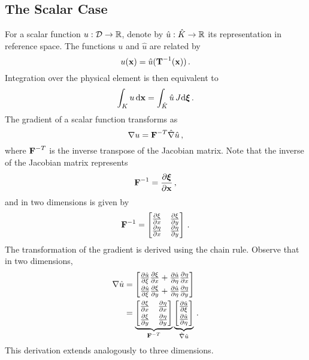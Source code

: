 \documentclass[../doc.tex]{subfiles}
\begin{document}
\subsection{The Scalar Case}
For a scalar function $u : \mathcal{D} \rightarrow \mathbb{R}$, denote by $\hat{u} : \hat{K} \rightarrow \mathbb{R}$ its representation in reference space. The functions $u$ and $\hat{u}$ are related by 
	\begin{equation} \label{fem:scalar_trans}
		u(\boldsymbol{\mathrm{x}}) = \hat{u}(\boldsymbol{\mathrm{T}}^{-1}(\boldsymbol{\mathrm{x}})) \,.  	
	\end{equation}
Integration over the physical element is then equivalent to 
	\begin{equation}
		\int_K u \mathop{}\!\mathrm{d} \boldsymbol{\mathrm{x}} = \int_{\hat{K}} \hat{u}\, J\!\mathop{}\!\mathrm{d}\boldsymbol{\xi} \,. 
	\end{equation}
The gradient of a scalar function transforms as
	\begin{equation} \label{fem:scalar_trans_grad}
		\nabla u = \boldsymbol{\mathrm{F}}^{-T} \hat{\nabla} \hat{u} \,, 
	\end{equation}
where $\boldsymbol{\mathrm{F}}^{-T}$ is the inverse transpose of the Jacobian matrix. Note that the inverse of the Jacobian matrix represents
	\begin{equation}
		\boldsymbol{\mathrm{F}}^{-1} = \frac{\partial \boldsymbol{\xi}}{\partial \boldsymbol{\mathrm{x}}} \,, 
	\end{equation}
and in two dimensions is given by 
	\begin{equation}
		\boldsymbol{\mathrm{F}}^{-1} = \begin{bmatrix} 
			\frac{\partial \xi}{\partial x} & \frac{\partial \xi}{\partial y} \\ 
			\frac{\partial \eta}{\partial x} & \frac{\partial \eta}{\partial y} 
		\end{bmatrix} \,. 
	\end{equation}
The transformation of the gradient is derived using the chain rule. Observe that in two dimensions, 
	\begin{equation}
	\begin{aligned}
		\nabla \hat{u} &= \begin{bmatrix} 
			\frac{\partial \hat{u}}{\partial \xi} \frac{\partial \xi}{\partial x} + \frac{\partial \hat{u}}{\partial \eta}\frac{\partial \eta}{\partial x} \\[3pt]
			\frac{\partial \hat{u}}{\partial \xi} \frac{\partial \xi}{\partial y} + \frac{\partial \hat{u}}{\partial \eta}\frac{\partial \eta}{\partial y}
		\end{bmatrix} \\
		&= \underbrace{\begin{bmatrix} 
			\frac{\partial \xi}{\partial x} & \frac{\partial \eta}{\partial x} \\[3pt]
			\frac{\partial \xi}{\partial y} & \frac{\partial \eta}{\partial y} 
		\end{bmatrix}}_{\boldsymbol{\mathrm{F}}^{-T}}
		\underbrace{
		\begin{bmatrix} 
			\frac{\partial \hat{u}}{\partial \xi} \\[3pt] \frac{\partial \hat{u}}{\partial \eta} 
		\end{bmatrix}}_{\hat{\nabla} \hat{u}} \,. 
	\end{aligned}
	\end{equation}
This derivation extends analogously to three dimensions. 
\end{document}
